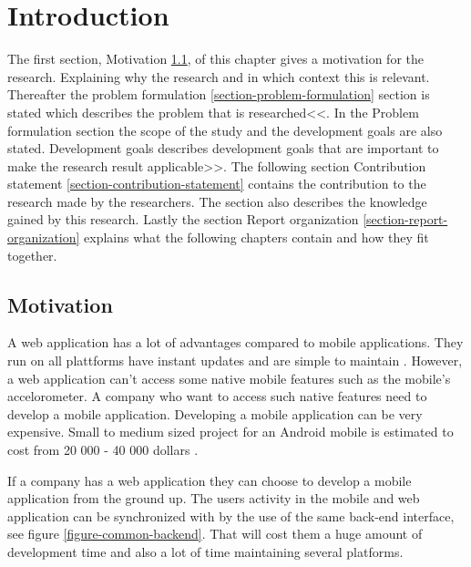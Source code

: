 \chapter{Introduction}\label{chapter-introduction}
The first section, Motivation \ref{section-motivation}, of this chapter gives a motivation for the research. Explaining why the research and in which context this is relevant. Thereafter the problem formulation \ref{section-problem-formulation} section is stated which describes the problem that is researched<<. In the Problem formulation section the scope of the study and the development goals are also stated. Development goals describes development goals that are important to make the research result applicable>>. The following section Contribution statement \ref{section-contribution-statement} contains the contribution to the research made by the researchers. The section also describes the knowledge gained by this research. Lastly the section Report organization \ref{section-report-organization} explains what the following chapters contain and how they fit together.

\section{Motivation}\label{section-motivation}
A web application has a lot of advantages compared to mobile applications. They run on all plattforms have instant updates and are simple to maintain \cite{michaels2013}. However, a web application can't access some native mobile features such as the mobile's accelorometer. A company who want to access such native features need to develop a mobile application. Developing a mobile application can be very expensive. Small to medium sized project for an Android mobile is estimated to cost from 20 000 - 40 000 dollars \cite{kohan2015}.

If a company has a web application they can choose to develop a mobile application from the ground up. The users activity in the mobile and web application can be synchronized with by the use of the same back-end interface, see figure \ref{figure-common-backend}. That will cost them a huge amount of development time and also a lot of time maintaining several platforms.

